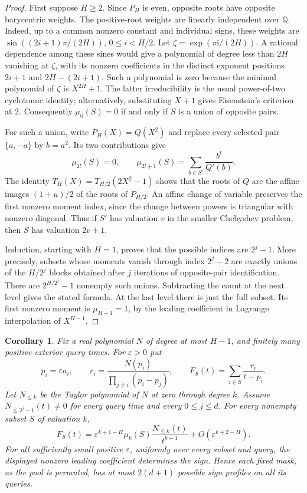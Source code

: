 \documentclass[11pt]{article}
\newtheorem{corollary}{Corollary}
\begin{document}
\begin{proof}
First suppose $H\geq2$. Since $P_H$ is even, opposite roots have
opposite barycentric weights. The positive-root weights are linearly
independent over $\mathbb Q$. Indeed, up to a common nonzero constant
and individual signs, these weights are
$\sin((2i+1)\pi/(2H))$, $0\leq i<H/2$.
Let $\zeta=\exp(\pi\mathrm i/(2H))$. A rational dependence among these
sines would give a polynomial of degree less than $2H$ vanishing at
$\zeta$, with its nonzero coefficients in the distinct exponent positions
$2i+1$ and $2H-(2i+1)$. Such a polynomial is zero because the minimal
polynomial of $\zeta$ is $X^{2H}+1$. The latter irreducibility is the
usual power-of-two cyclotomic identity; alternatively, substituting
$X+1$ gives Eisenstein's criterion at $2$.
Consequently $\mu_0(S)=0$ if and only if $S$ is a union of opposite pairs.

For such a union, write $P_H(X)=Q(X^2)$ and replace every selected pair
$\{a,-a\}$ by $b=a^2$. Its two contributions give
\[
 \mu_{2l}(S)=0,\qquad
 \mu_{2l+1}(S)=\sum_{b\in S'}\frac{b^l}{Q'(b)}.
\]
The identity $T_H(X)=T_{H/2}(2X^2-1)$ shows that the roots of $Q$ are
the affine images $(1+u)/2$ of the roots of $P_{H/2}$. An affine change
of variable preserves the first nonzero moment index, since the
change between powers is triangular with nonzero diagonal. Thus if
$S'$ has valuation $v$ in the smaller Chebyshev problem, then $S$ has
valuation $2v+1$.

Induction, starting with $H=1$, proves that the possible indices are
$2^j-1$. More precisely, subsets whose moments vanish through index
$2^j-2$ are exactly unions of the $H/2^j$ blocks obtained after $j$
iterations of opposite-pair identification. There are
$2^{H/2^j}-1$ nonempty such unions. Subtracting the count at the next
level gives the stated formula. At the last level there is just the
full subset. Its first nonzero moment is $\mu_{H-1}=1$, by the leading
coefficient in Lagrange interpolation of $X^{H-1}$.
\end{proof}

\begin{corollary}
Fix a real polynomial $N$ of degree at most $H-1$, and finitely many
positive exterior query times. For $\varepsilon>0$ put
\[
 p_i=\varepsilon a_i,\qquad
 r_i=\frac{N(p_i)}{\prod_{j\ne i}(p_i-p_j)},\qquad
 F_S(t)=\sum_{i\in S}\frac{r_i}{t-p_i}.
\]
Let $N_{\leq k}$ be the Taylor polynomial of $N$ at zero through degree
$k$. Assume $N_{\leq 2^j-1}(t)\ne0$ for every query time and every
$0\leq j\leq d$. For every nonempty subset $S$ of valuation $k$,
\[
 F_S(t)=\varepsilon^{k+1-H}
 \mu_k(S)\frac{N_{\leq k}(t)}{t^{k+1}}
 +O(\varepsilon^{k+2-H}).
\]
For all sufficiently small positive $\varepsilon$, uniformly over every
subset and query, the displayed nonzero leading coefficient determines
the sign. Hence each fixed mask, as the pool is permuted, has at most
$2(d+1)$ possible sign profiles on all its queries.
\end{corollary}
\end{document}
